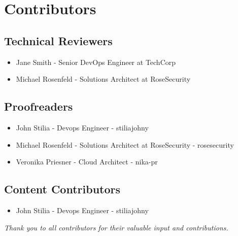 \chapter*{Contributors}
\section*{Technical Reviewers}
\begin{itemize}[noitemsep]
    \item Jane Smith - Senior DevOps Engineer at TechCorp
    \item Michael Rosenfeld - Solutions Architect at RoseSecurity
\end{itemize}

\section*{Proofreaders}
\begin{itemize}[noitemsep]
    \item John Stilia - Devops Engineer - stiliajohny
    \item Michael Rosenfeld - Solutions Architect at RoseSecurity - rosesecurity
    \item Veronika Priesner - Cloud Architect - nika-pr
    
\end{itemize}

\section*{Content Contributors}
\begin{itemize}[noitemsep]
    \item John Stilia - Devops Engineer - stiliajohny
\end{itemize}

\vspace{0.5cm}
\begin{center}
\small\emph{Thank you to all contributors for their valuable input and contributions.}
\end{center}

\clearpage
